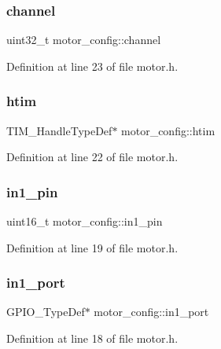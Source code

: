 \subsubsection{\texorpdfstring{channel}{channel}}
{\footnotesize\ttfamily uint32\+\_\+t motor\+\_\+config\+::channel}



Definition at line 23 of file motor.\+h.

\mbox{\label{structmotor__config_a9926810d168ac02bb71d8da15fbcd10d}} 
\subsubsection{\texorpdfstring{htim}{htim}}
{\footnotesize\ttfamily T\+I\+M\+\_\+\+Handle\+Type\+Def$\ast$ motor\+\_\+config\+::htim}



Definition at line 22 of file motor.\+h.

\mbox{\label{structmotor__config_ab96ecf85a5bee0e13f1be1ac799ee24b}} 
\subsubsection{\texorpdfstring{in1\_pin}{in1\_pin}}
{\footnotesize\ttfamily uint16\+\_\+t motor\+\_\+config\+::in1\+\_\+pin}



Definition at line 19 of file motor.\+h.

\mbox{\label{structmotor__config_a954fcd761395de38e251e7052126fe37}} 
\subsubsection{\texorpdfstring{in1\_port}{in1\_port}}
{\footnotesize\ttfamily G\+P\+I\+O\+\_\+\+Type\+Def$\ast$ motor\+\_\+config\+::in1\+\_\+port}



Definition at line 18 of file motor.\+h.

\mbox{\label{structmotor__config_ab494f14e301a7553f90ffd25c0ccfe7f}} 
